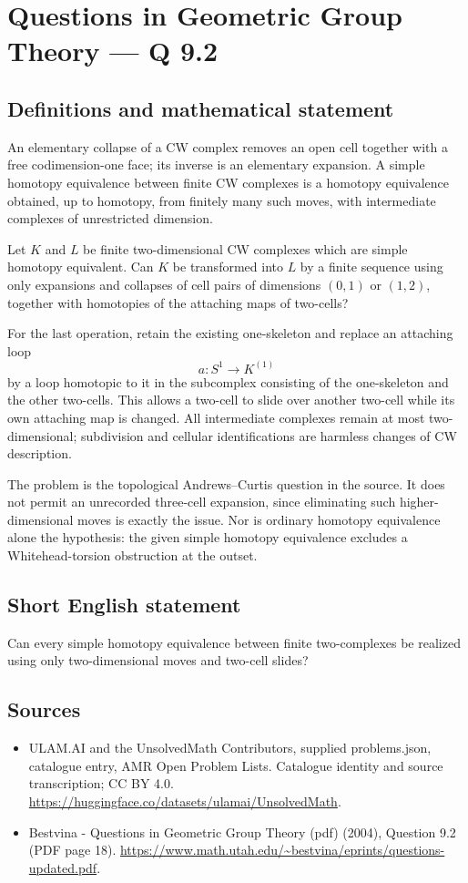 \documentclass[11pt,a4paper]{article}
\begin{document}
\section*{Questions in Geometric Group Theory — Q 9.2}\label{statement}

\subsection{Definitions and mathematical statement}
An elementary collapse of a CW complex removes an open cell together with a free codimension-one face; its inverse is an elementary expansion. A simple homotopy equivalence between finite CW complexes is a homotopy equivalence obtained, up to homotopy, from finitely many such moves, with intermediate complexes of unrestricted dimension.

Let $K$ and $L$ be finite two-dimensional CW complexes which are simple homotopy equivalent. Can $K$ be transformed into $L$ by a finite sequence using only expansions and collapses of cell pairs of dimensions $(0,1)$ or $(1,2)$, together with homotopies of the attaching maps of two-cells?

For the last operation, retain the existing one-skeleton and replace an attaching loop
\[
 a:S^1\longrightarrow K^{(1)}
\]
by a loop homotopic to it in the subcomplex consisting of the one-skeleton and the other two-cells. This allows a two-cell to slide over another two-cell while its own attaching map is changed. All intermediate complexes remain at most two-dimensional; subdivision and cellular identifications are harmless changes of CW description.

The problem is the topological Andrews--Curtis question in the source. It does not permit an unrecorded three-cell expansion, since eliminating such higher-dimensional moves is exactly the issue. Nor is ordinary homotopy equivalence alone the hypothesis: the given simple homotopy equivalence excludes a Whitehead-torsion obstruction at the outset.
\subsection{Short English statement}
Can every simple homotopy equivalence between finite two-complexes be realized using only two-dimensional moves and two-cell slides?
\subsection{Sources}
\begin{itemize}
\item[S1] ULAM.AI and the UnsolvedMath Contributors, supplied problems.json, catalogue entry, AMR Open Problem Lists. Catalogue identity and source transcription; CC BY 4.0.
\url{https://huggingface.co/datasets/ulamai/UnsolvedMath}.
\item[S2] Bestvina - Questions in Geometric Group Theory (pdf) (2004), Question 9.2 (PDF page 18). 
\url{https://www.math.utah.edu/~bestvina/eprints/questions-updated.pdf}.
\end{itemize}
\end{document}
